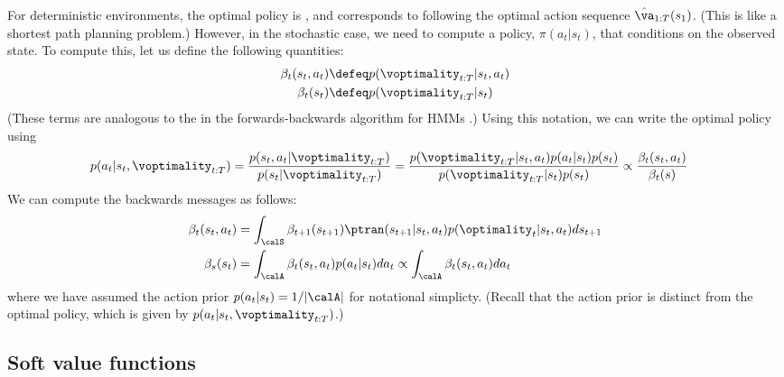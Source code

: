 For deterministic environments, the optimal policy is ,
and corresponds to following the optimal action sequence $\hat{\va}_{1:T}(s_1)$.
(This is like a shortest path planning problem.)
However, in the stochastic case, we need to compute a  policy,
$\pi(a_t|s_t)$,
that conditions on the observed state.
To compute this, let us define the following quantities:
\begin{align}
  \beta_t(s_t,a_t) &\defeq  p(\voptimality_{t:T}|s_t,a_t)\\
  \beta_t(s_t) &\defeq  p(\voptimality_{t:T}|s_t)
\end{align}
(These terms are
analogous to the  in the forwards-backwards algorithm
for HMMs \citep{Rabiner89}.)
Using this notation,
we can write the optimal policy using
\begin{align}
  p(a_t|s_t,\voptimality_{t:T}) &=
  \frac{p(s_t,a_t|\voptimality_{t:T})}{p(s_t|\voptimality_{t:T})}
  = \frac{p(\voptimality_{t:T}|s_t,a_t)p(a_t|s_t)p(s_t)}
  {p(\voptimality_{t:T}|s_t)p(s_t)} 
 \propto \frac{\beta_t(s_t,a_t)}{\beta_t(s)}
\label{eqn:rl-merl-optimal}
\end{align}
We can compute the backwards messages as follows:
\begin{align}
  \beta_t(s_t,a_t) &= 
  \int_\calS \beta_{t+1}(s_{t+1})
  \ptran(s_{t+1}|s_t,a_t) p(\optimality_t|s_t,a_t) ds_{t+1} \\
  \beta_s(s_t) &= \int_\calA \beta_t(s_t,a_t) p(a_t|s_t) da_t
\propto \int_\calA \beta_t(s_t,a_t) da_t  
\end{align}
where we have assumed the action prior $p(a_t|s_t) = 1/|\calA|$
for notational simplicty.
(Recall that the action prior is distinct from the optimal policy,
which is given by $p(a_t|s_t,\voptimality_{t:T})$.)

\subsection{Soft value functions}

